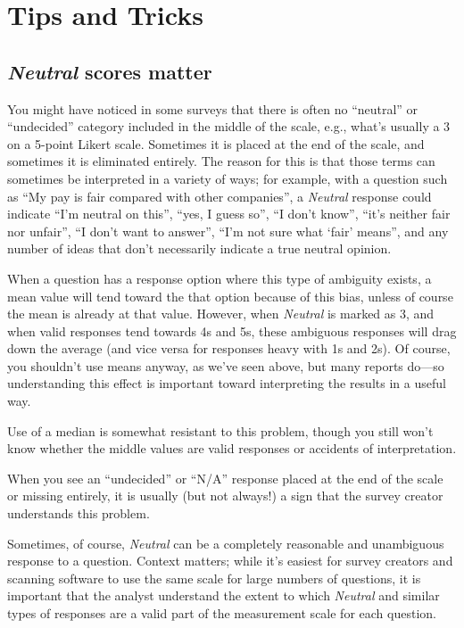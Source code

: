 \documentclass[]{book}
\begin{document}
\chapter{Tips and Tricks}\label{tips-and-tricks}

\section{\texorpdfstring{\emph{Neutral} scores
matter}{Neutral scores matter}}\label{neutral-scores-matter}

You might have noticed in some surveys that there is often no
``neutral'' or ``undecided'' category included in the middle of the
scale, e.g., what's usually a 3 on a 5-point Likert scale. Sometimes it
is placed at the end of the scale, and sometimes it is eliminated
entirely. The reason for this is that those terms can sometimes be
interpreted in a variety of ways; for example, with a question such as
``My pay is fair compared with other companies'', a \emph{Neutral}
response could indicate ``I'm neutral on this'', ``yes, I guess so'',
``I don't know'', ``it's neither fair nor unfair'', ``I don't want to
answer'', ``I'm not sure what `fair' means'', and any number of ideas
that don't necessarily indicate a true neutral opinion.

When a question has a response option where this type of ambiguity
exists, a mean value will tend toward the that option because of this
bias, unless of course the mean is already at that value. However, when
\emph{Neutral} is marked as 3, and when valid responses tend towards 4s
and 5s, these ambiguous responses will drag down the average (and vice
versa for responses heavy with 1s and 2s). Of course, you shouldn't use
means anyway, as we've seen above, but many reports do---so
understanding this effect is important toward interpreting the results
in a useful way.

Use of a median is somewhat resistant to this problem, though you still
won't know whether the middle values are valid responses or accidents of
interpretation.

When you see an ``undecided'' or ``N/A'' response placed at the end of
the scale or missing entirely, it is usually (but not always!) a sign
that the survey creator understands this problem.

Sometimes, of course, \emph{Neutral} can be a completely reasonable and
unambiguous response to a question. Context matters; while it's easiest
for survey creators and scanning software to use the same scale for
large numbers of questions, it is important that the analyst understand
the extent to which \emph{Neutral} and similar types of responses are a
valid part of the measurement scale for each question.
\end{document}
